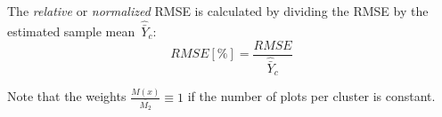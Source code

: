 \documentclass[remotesensing,article,accept,moreauthors,pdftex,10pt,a4paper]{Definitions/mdpi}
\begin{document}
The \textit{relative} or \textit{normalized} RMSE is calculated by dividing the RMSE by the estimated sample mean~$\hat{\bar{Y}}_c$:
\begin{equation*}\label{eq:NRMSE_clust}
RMSE[\%]  =  \frac{RMSE}{\hat{\bar{Y}}_c}
\end{equation*}

Note that the weights $\frac{M(x)}{\bar{M_2}} \equiv 1$ if the number of plots per cluster is constant.



\end{document}
